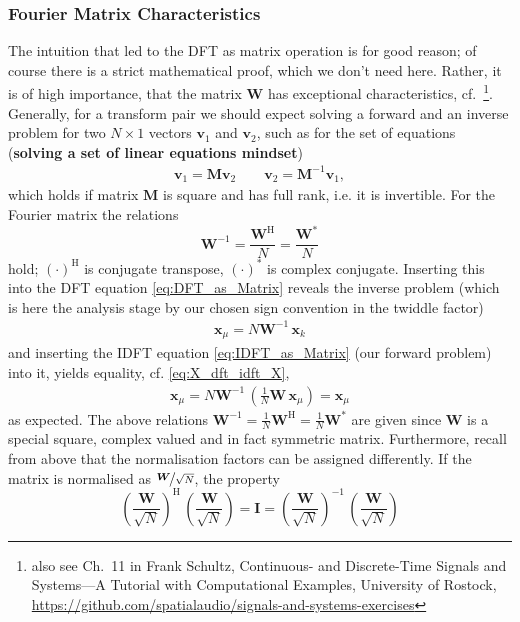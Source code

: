 \documentclass[11pt,a4paper,DIV=12]{scrartcl}
\begin{document}
\subsubsection{Fourier Matrix Characteristics}
%
The intuition that led to the DFT as matrix operation is for good reason;
of course there is a strict mathematical proof, which we don't need here.
%
Rather, it is of high importance, that
the matrix $\bm W$ has exceptional characteristics,
cf.~\cite[Ch.~IV.2]{Strang2019}\footnote{
also see Ch.~11 in Frank Schultz, Continuous- and Discrete-Time
Signals and Systems---A Tutorial with Computational Examples,
University of Rostock,
\url{https://github.com/spatialaudio/signals-and-systems-exercises}
}.
%
Generally, for a transform pair we should expect solving a forward and an
inverse problem for two $N \times 1$ vectors $\bm v_1$ and $\bm v_2$,
such as for the set
of equations (\textbf{solving a set of linear equations mindset})
\begin{align}
\bm v_1 = \bm M \bm v_2\qquad \bm v_2 = \bm M^{-1} \bm v_1,
\end{align}
which holds if matrix $\bm M$ is square and has full rank, i.e. it is invertible.
%
For the Fourier matrix the relations
\begin{equation}
\mathbf{W}^{-1}
= \frac{\mathbf{W}^\mathrm{H}}{N}
= \frac{\mathbf{W}^\mathrm{*}}{N}
\end{equation}
hold; $(\cdot)^\mathrm{H}$ is conjugate transpose, $(\cdot)^*$ is
complex conjugate.
%
Inserting this into the DFT equation \eqref{eq:DFT_as_Matrix} reveals the
inverse problem (which is here the analysis stage by our chosen sign convention
in the twiddle factor)
\begin{align}
\bm{x}_\mu = N \bm{W}^{-1} \, \bm{x}_k
\end{align}
and inserting the IDFT equation \eqref{eq:IDFT_as_Matrix} (our forward problem)
into it, yields equality, cf. \eqref{eq:X_dft_idft_X},
\begin{align}
\bm{x}_\mu = N \bm{W}^{-1} \, (\frac{1}{N} \bm{W} \, \bm{x}_\mu) =
\bm x_\mu
\end{align}
as expected.
%
The above relations
$\mathbf{W}^{-1}
= \frac{1}{N} \mathbf{W}^\mathrm{H}
= \frac{1}{N} \mathbf{W}^\mathrm{*}$
are given since $\mathbf{W}$ is a special square, complex
valued and in fact symmetric matrix.
%
Furthermore, recall from above that the normalisation factors can be assigned
differently.
%
\label{pg:unitary}
If the matrix is normalised as $\nicefrac{\bm W}{\sqrt{N}}$, the property
\begin{equation}
\left(\frac{\mathbf{W}}{\sqrt{N}}\right)^\mathrm{H} \, \left(\frac{\mathbf{W}}{\sqrt{N}}\right) = \mathbf{I}
=
\left(\frac{\mathbf{W}}{\sqrt{N}} \right)^{-1} \, \left(\frac{\mathbf{W}}{\sqrt{N}} \right)
\end{equation}
\end{document}
